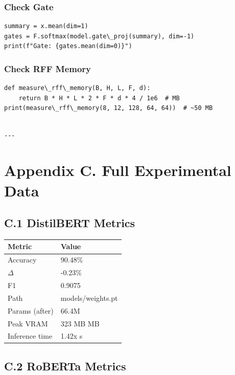 \subsubsection{Check Gate}

\begin{lstlisting}
summary = x.mean(dim=1)
gates = F.softmax(model.gate\_proj(summary), dim=-1)
print(f"Gate: {gates.mean(dim=0)}")
\end{lstlisting}

\subsubsection{Check RFF Memory}

\begin{lstlisting}
def measure\_rff\_memory(B, H, L, F, d):
    return B * H * L * 2 * F * d * 4 / 1e6  # MB
print(measure\_rff\_memory(8, 12, 128, 64, 64))  # ~50 MB
\end{lstlisting}
\begin{lstlisting}

---
\end{lstlisting}


\section{Appendix C. Full Experimental Data}

\subsection{C.1 DistilBERT Metrics}

\begin{table}[H]
\centering
\small
\begin{tabular}{ll}
\toprule
\textbf{Metric} & \textbf{Value} \\
\midrule
Accuracy & 90.48\% \\
$\Delta$ & -0.23\% \\
F1 & 0.9075 \\
Path & models/weights.pt \\
Params (after) & 66.4M \\
Peak VRAM & 323 MB MB \\
Inference time & 1.42x s \\
\bottomrule
\end{tabular}
\end{table}

\subsection{C.2 RoBERTa Metrics}

